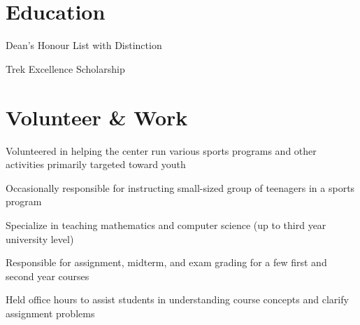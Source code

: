 \documentclass[]{deedy-resume-openfont}
\begin{document}
~\\~\\

\section{Education}
\begin{tightemize}
\item Dean's Honour List with Distinction
\item Trek Excellence Scholarship
\end{tightemize}
\sectionsep

\section{Volunteer \& Work}
\vspace{\topsep} %
\begin{tightemize}
\item Volunteered in helping the center run various sports programs and other activities primarily targeted toward youth 
\item Occasionally responsible for instructing small-sized group of teenagers in a sports program
\end{tightemize}
\sectionsep

\descript{}
\begin{tightemize}
\item Specialize in teaching mathematics and computer science (up to third year university level)
\end{tightemize}
\sectionsep

\begin{tightemize}
\item Responsible for assignment, midterm, and exam grading for a few first and second year courses
\item Held office hours to assist students in understanding course concepts and clarify assignment problems
\end{tightemize}
\sectionsep
\end{document}
